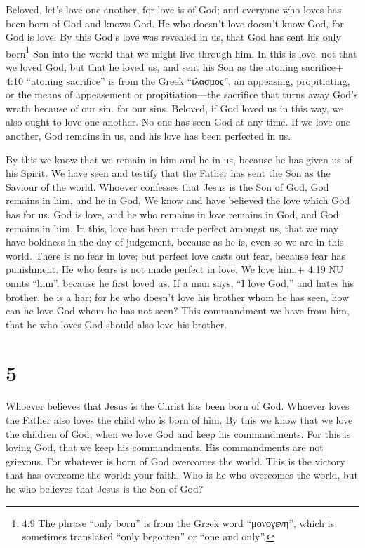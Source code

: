  Beloved, let's love one another, for love is of God; and
everyone who loves has been born of God and knows God.  He
who doesn't love doesn't know God, for God is love.  By this
God's love was revealed in us, that God has sent his only
born\footnote{4:9 The phrase ``only born'' is from the Greek word
  ``μονογενη'', which is sometimes translated ``only begotten'' or ``one
  and only''.} Son into the world that we might live through him.
 In this is love, not that we loved God, but that he loved
us, and sent his Son as the atoning sacrifice+ 4:10 ``atoning
sacrifice'' is from the Greek ``ιλασμος'', an appeasing, propitiating,
or the means of appeasement or propitiation---the sacrifice that turns
away God's wrath because of our sin. for our sins. 
Beloved, if God loved us in this way, we also ought to love one another.
 No one has seen God at any time. If we love one another,
God remains in us, and his love has been perfected in us.

 By this we know that we remain in him and he in us,
because he has given us of his Spirit.  We have seen and
testify that the Father has sent the Son as the Saviour of the world.
 Whoever confesses that Jesus is the Son of God, God
remains in him, and he in God.  We know and have believed
the love which God has for us. God is love, and he who remains in love
remains in God, and God remains in him.  In this, love has
been made perfect amongst us, that we may have boldness in the day of
judgement, because as he is, even so we are in this world. 
There is no fear in love; but perfect love casts out fear, because fear
has punishment. He who fears is not made perfect in love. 
We love him,+ 4:19 NU omits ``him''. because he first loved us.
 If a man says, ``I love God,'' and hates his brother, he
is a liar; for he who doesn't love his brother whom he has seen, how can
he love God whom he has not seen?  This commandment we have
from him, that he who loves God should also love his brother.

\hypertarget{section-4}{%
\section{5}\label{section-4}}

 Whoever believes that Jesus is the Christ has been born of
God. Whoever loves the Father also loves the child who is born of him.
 By this we know that we love the children of God, when we
love God and keep his commandments.  For this is loving God,
that we keep his commandments. His commandments are not grievous.
 For whatever is born of God overcomes the world. This is
the victory that has overcome the world: your faith.  Who is
he who overcomes the world, but he who believes that Jesus is the Son of
God?

